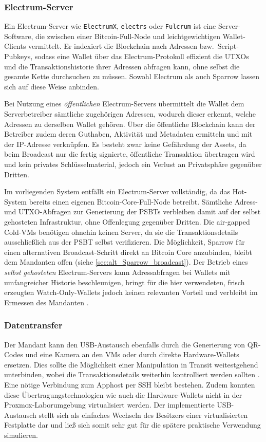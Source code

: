\subsubsection{Electrum-Server} \label{sec:electrum_serv}
Ein Electrum-Server wie \texttt{ElectrumX}, \texttt{electrs} oder \texttt{Fulcrum} ist eine Server-Software, die zwischen einer Bitcoin-Full-Node und leichtgewichtigen Wallet-Clients vermittelt. Er indexiert die Blockchain nach Adressen bzw.\ Script-Pubkeys, sodass eine Wallet über das Electrum-Protokoll effizient die \acp{UTXO} und die Transaktionshistorie ihrer Adressen abfragen kann, ohne selbst die gesamte Kette durchsuchen zu müssen. Sowohl Electrum als auch Sparrow lassen sich auf diese Weise anbinden.

Bei Nutzung eines \emph{öffentlichen} Electrum-Servers übermittelt die Wallet dem Serverbetreiber sämtliche zugehörigen Adressen, wodurch dieser erkennt, welche Adressen zu derselben Wallet gehören. Über die öffentliche Blockchain kann der Betreiber zudem deren Guthaben, Aktivität und Metadaten ermitteln und mit der IP-Adresse verknüpfen. Es besteht zwar keine Gefährdung der Assets, da beim Broadcast nur die fertig signierte, öffentliche Transaktion übertragen wird und kein privates Schlüsselmaterial, jedoch ein Verlust an Privatsphäre gegenüber Dritten.

Im vorliegenden System entfällt ein Electrum-Server vollständig, da das Hot-System bereits einen eigenen Bitcoin-Core-Full-Node betreibt. Sämtliche Adress- und \ac{UTXO}-Abfragen zur Generierung der \acp{PSBT} verbleiben damit auf der selbst gehosteten Infrastruktur, ohne Offenlegung gegenüber Dritten. 
Die air-gapped Cold-\acp{VM} benötigen ohnehin keinen Server, da sie die Transaktionsdetails ausschließlich aus der \ac{PSBT} selbst verifizieren. Die Möglichkeit, Sparrow für einen alternativen Broadcast-Schritt direkt an Bitcoin Core anzubinden, bleibt dem Mandanten offen (siehe \ref{sec:alt_Sparrow_broadcast}).
Der Betrieb eines \emph{selbst gehosteten} Electrum-Servers kann Adressabfragen bei Wallets mit umfangreicher Historie beschleunigen, bringt für die hier verwendeten, frisch erzeugten Watch-Only-Wallets jedoch keinen relevanten Vorteil und verbleibt im Ermessen des Mandanten \cite{sparrow_quick,Sparrow_Wallets_Node_Connect, electrumx_docs}.

\subsubsection{Datentransfer}
Der Mandant kann den \ac{USB}-Austausch ebenfalls durch die Generierung von \ac{QR}-Codes und eine Kamera an den \acp{VM} oder durch direkte Hardware-Wallets ersetzen. Dies sollte die Möglichkeit einer Manipulation in Transit weitestgehend unterbinden, wobei die Transaktionsdetails weiterhin kontrolliert werden sollten \cite{Wallets,knowingbitcoin_airgap,Hardware_VS_Cold-Wallet}. Eine nötige Verbindung zum Apphost per \ac{SSH} bleibt bestehen.
Zudem konnten diese Übertragungstechnologien wie auch die Hardware-Wallets nicht in der Proxmox-Laborumgebung virtualisiert werden. Der implementierte \ac{USB}-Austausch stellt sich als einfaches Wechseln des Besitzers einer virtualisierten Festplatte dar und ließ sich somit sehr gut für die spätere praktische Verwendung simulieren.

